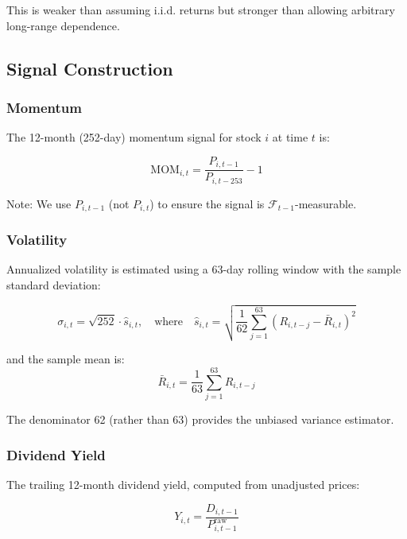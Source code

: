 \documentclass[12pt,a4paper]{article}
\theoremstyle{definition}
\begin{document}
This is weaker than assuming i.i.d. returns but stronger than allowing arbitrary long-range dependence.

\subsection{Signal Construction}

\subsubsection{Momentum}

The 12-month (252-day) momentum signal for stock $i$ at time $t$ is:

\begin{equation}
\text{MOM}_{i,t} = \frac{P_{i,t-1}}{P_{i,t-253}} - 1
\label{eq:momentum}
\end{equation}

Note: We use $P_{i,t-1}$ (not $P_{i,t}$) to ensure the signal is $\mathcal{F}_{t-1}$-measurable.

\subsubsection{Volatility}

Annualized volatility is estimated using a 63-day rolling window with the sample standard deviation:

\begin{equation}
\sigma_{i,t} = \sqrt{252} \cdot \hat{s}_{i,t}, \quad \text{where} \quad \hat{s}_{i,t} = \sqrt{\frac{1}{62} \sum_{j=1}^{63} \left( R_{i,t-j} - \bar{R}_{i,t} \right)^2}
\label{eq:volatility}
\end{equation}

and the sample mean is:
\begin{equation}
\bar{R}_{i,t} = \frac{1}{63} \sum_{j=1}^{63} R_{i,t-j}
\label{eq:sample_mean}
\end{equation}

The denominator 62 (rather than 63) provides the unbiased variance estimator.

\subsubsection{Dividend Yield}

The trailing 12-month dividend yield, computed from unadjusted prices:

\begin{equation}
Y_{i,t} = \frac{D_{i,t-1}}{P_{i,t-1}^{\text{raw}}}
\label{eq:dividend_yield}
\end{equation}
\end{document}
